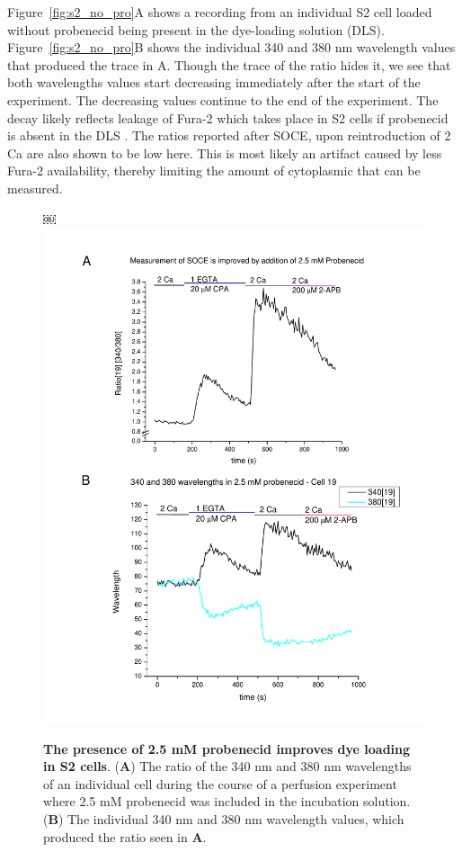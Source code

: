Figure~\ref{fig:s2_no_pro}A shows a recording from an individual S2 cell loaded without probenecid being present in the dye-loading solution (DLS).  Figure~\ref{fig:s2_no_pro}B shows the individual 340 and 380 nm wavelength values that produced the trace in A. Though the trace of the ratio hides it, we see that both wavelengths values start decreasing immediately after the start of the experiment. The decreasing values continue to the end of the experiment. The decay likely reflects leakage of Fura-2 which takes place in S2 cells if probenecid is absent in the DLS \citep{DiVirgilio1990}. The \Ca{} ratios reported after SOCE, upon reintroduction of 2 Ca are  also shown to be low here. This is most likely an artifact caused by less Fura-2 availability, thereby limiting the amount of cytoplasmic \Ca{} that can be measured.

\newpage

\begin{figure}[!ht]
￼\includegraphics[scale=0.52]{Figures/s2_cell19_pro.pdf}
\caption[Probenecid improves dye loading in S2 cells]
	{{\bfseries The presence of 2.5 mM probenecid improves dye loading in S2 cells}. ({\bfseries A}) The ratio of the 340 nm and 380 nm wavelengths of an individual cell during the course of a perfusion experiment where 2.5 mM probenecid was included in the incubation solution. ({\bfseries B}) The individual 340 nm and 380 nm wavelength values, which produced the ratio seen in {\bfseries A}.}
\label{fig:s2_with_pro}
\end{figure}

